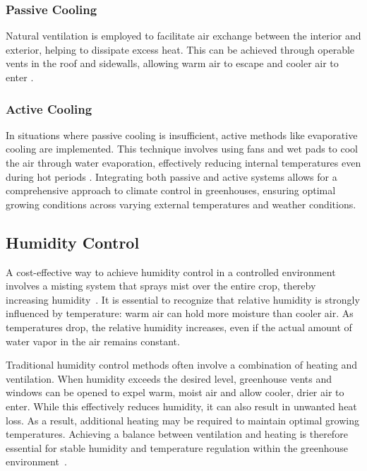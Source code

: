 \subsubsection*{Passive Cooling}
Natural ventilation is employed to facilitate air exchange between the interior and exterior, helping to dissipate excess heat. This can be achieved through operable vents in the roof and sidewalls, allowing warm air to escape and cooler air to enter \citep{faridi_cooling}.

\subsubsection*{Active Cooling}
In situations where passive cooling is insufficient, active methods like evaporative cooling are implemented. This technique involves using fans and wet pads to cool the air through water evaporation, effectively reducing internal temperatures even during hot periods \citep{verma_cooling}. Integrating both passive and active systems allows for a comprehensive approach to climate control in greenhouses, ensuring optimal growing conditions across varying external temperatures and weather conditions.

\subsection{Humidity Control}

A cost-effective way to achieve humidity control in a controlled environment involves a misting system that sprays mist over the entire crop, thereby increasing humidity~\citep{controlling_humidity}. It is essential to recognize that relative humidity is strongly influenced by temperature: warm air can hold more moisture than cooler air. As temperatures drop, the relative humidity increases, even if the actual amount of water vapor in the air remains constant. \citep{Lawrence2005RHdewpoint}

Traditional humidity control methods often involve a combination of heating and ventilation. When humidity exceeds the desired level, greenhouse vents and windows can be opened to expel warm, moist air and allow cooler, drier air to enter. While this effectively reduces humidity, it can also result in unwanted heat loss. As a result, additional heating may be required to maintain optimal growing temperatures. Achieving a balance between ventilation and heating is therefore essential for stable humidity and temperature regulation within the greenhouse environment~\citep{pepper_guide}.

